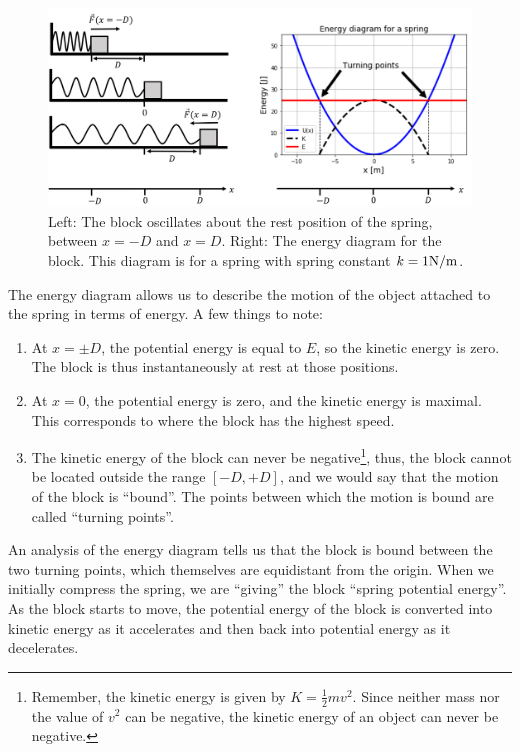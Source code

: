 \begin{figure}[!htbp]
\centering
\includegraphics[width=1\linewidth]{files/springE-eaf9354703557107d14f7d6c630c1335.png}
\caption[]{Left: The block oscillates about the rest position of the spring, between $x= -D$ and $x=D$. Right: The energy diagram for the block. This diagram is for a spring with spring constant $k=1 {\rm N/m}$.}
\label{fig:potentialecons:springE}
\end{figure}

The energy diagram allows us to describe the motion of the object attached to the spring in terms of energy. A few things to note:

\begin{enumerate}
\item At $x=\pm D$, the potential energy is equal to $E$, so the kinetic energy is zero. The block is thus instantaneously at rest at those positions.
\item At $x=0$, the potential energy is zero, and the kinetic energy is maximal. This corresponds to where the block has the highest speed.
\item The kinetic energy of the block can never be negative\footnote{Remember, the kinetic energy is given by $K=\frac{1}{2}mv^2$. Since neither mass nor the value of $v^2$ can be negative, the kinetic energy of an object can never be negative.}, thus, the block cannot be located outside the range $[ -D,+D]$, and we would say that the motion of the block is ``bound''. The points between which the motion is bound are called ``turning points''.
\end{enumerate}

An analysis of the energy diagram tells us that the block is bound between the two turning points, which themselves are equidistant from the origin. When we initially compress the spring, we are ``giving'' the block ``spring potential energy''. As the block starts to move, the potential energy of the block is converted into kinetic energy as it accelerates and then back into potential energy as it decelerates.

